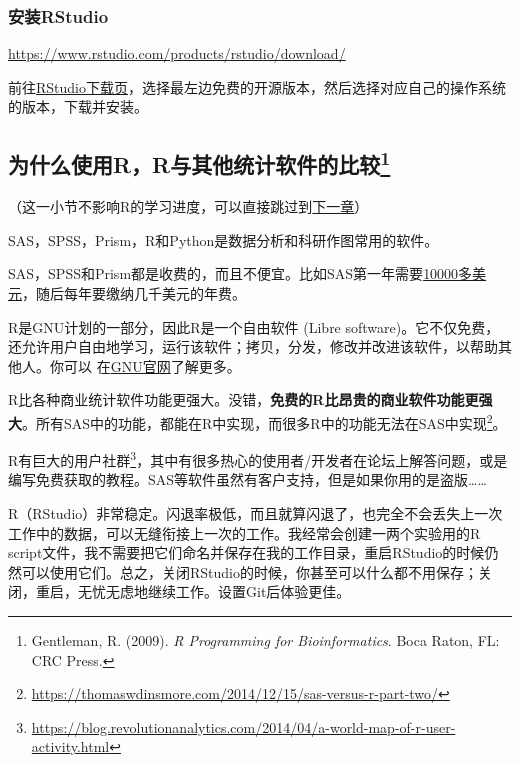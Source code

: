 \documentclass[]{book}
\let\rmarkdownfootnote\footnote%
\def\footnote{\protect\rmarkdownfootnote}
\begin{document}
\hypertarget{RStudio-install}{%
\subsubsection{安装RStudio}\label{RStudio-install}}

\url{https://www.rstudio.com/products/rstudio/download/}

前往\href{https://www.rstudio.com/products/rstudio/download/}{RStudio下载页}，选择最左边免费的开源版本，然后选择对应自己的操作系统的版本，下载并安装。

\hypertarget{youshi}{%
\subsection[为什么使用R，R与其他统计软件的比较]{\texorpdfstring{为什么使用R，R与其他统计软件的比较\footnote{Gentleman, R. (2009). \emph{R Programming for Bioinformatics}. Boca Raton, FL: CRC Press.}}{为什么使用R，R与其他统计软件的比较}}\label{youshi}}

（这一小节不影响R的学习进度，可以直接跳过到\protect\hyperlink{getting-help}{下一章}）

SAS，SPSS，Prism，R和Python是数据分析和科研作图常用的软件。

SAS，SPSS和Prism都是收费的，而且不便宜。比如SAS第一年需要\href{http://www.sas.com/store/products-solutions/cSoftware-p1.html}{10000多美元}，随后每年要缴纳几千美元的年费。

R是GNU计划的一部分，因此R是一个自由软件 (Libre software)。它不仅免费，还允许用户自由地学习，运行该软件；拷贝，分发，修改并改进该软件，以帮助其他人。你可以 在\href{https://www.gnu.org/philosophy/free-sw.zh-cn.html}{GNU官网}了解更多。

R比各种商业统计软件功能更强大。没错，\textbf{免费的R比昂贵的商业软件功能更强大}。所有SAS中的功能，都能在R中实现，而很多R中的功能无法在SAS中实现\footnote{\url{https://thomaswdinsmore.com/2014/12/15/sas-versus-r-part-two/}}。

R有巨大的用户社群\footnote{\url{https://blog.revolutionanalytics.com/2014/04/a-world-map-of-r-user-activity.html}}，其中有很多热心的使用者/开发者在论坛上解答问题，或是编写免费获取的教程。SAS等软件虽然有客户支持，但是如果你用的是盗版\ldots{}\ldots{}

R（RStudio）非常稳定。闪退率极低，而且就算闪退了，也完全不会丢失上一次工作中的数据，可以无缝衔接上一次的工作。我经常会创建一两个实验用的R script文件，我不需要把它们命名并保存在我的工作目录，重启RStudio的时候仍然可以使用它们。总之，关闭RStudio的时候，你甚至可以什么都不用保存；关闭，重启，无忧无虑地继续工作。设置Git后体验更佳。
\end{document}
